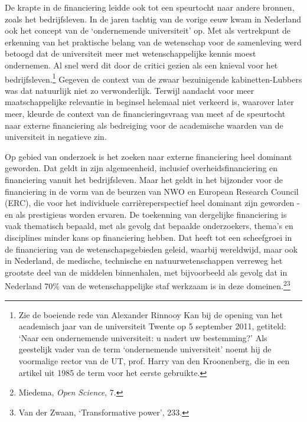 \documentclass[smallauthor, chapterhaspagenum, nochapterinheader, pagenuminheader,  bigchapnum,medium2, tocpages, garamond, titleinheader]{jote-book}
\begin{document}
	De krapte in de financiering leidde ook tot een speurtocht naar andere bronnen, zoals het bedrijfsleven. In de jaren tachtig van de vorige eeuw kwam in Nederland ook het concept van de ‘ondernemende universiteit' op. Met als vertrekpunt de erkenning van het praktische belang van de wetenschap voor de samenleving werd betoogd dat de universiteit meer met wetenschappelijke kennis moest ondernemen. Al snel werd dit door de critici gezien als een knieval voor het bedrijfsleven.\footnote{Zie de boeiende rede van Alexander Rinnooy Kan bij de opening van het academisch jaar van de universiteit Twente op 5 september 2011, getiteld: ‘Naar een ondernemende universiteit: u nadert uw bestemming?' Als geestelijk vader van de term ‘ondernemende universiteit' noemt hij de voormalige rector van de UT, prof. Harry van den Kroonenberg, die in een artikel uit 1985 de term voor het eerste gebruikte.} Gegeven de context van de zwaar bezuinigende kabinetten-Lubbers was dat natuurlijk niet zo verwonderlijk. Terwijl aandacht voor meer maatschappelijke relevantie in beginsel helemaal niet verkeerd is, waarover later meer, kleurde de context van de financieringsvraag van meet af de speurtocht naar externe financiering als bedreiging voor de academische waarden van de universiteit in negatieve zin.



	Op gebied van onderzoek is het zoeken naar externe financiering heel dominant geworden. Dat geldt in zijn algemeenheid, inclusief overheidsfinanciering en financiering vanuit het bedrijfsleven. Maar het geldt in het bijzonder voor de financiering in de vorm van de beurzen van NWO en European Research Council (ERC), die voor het individuele carrièreperspectief heel dominant zijn geworden - en als prestigieus worden ervaren. De toekenning van dergelijke financiering is vaak thematisch bepaald, met als gevolg dat bepaalde onderzoekers, thema's en disciplines minder kans op financiering hebben. Dat heeft tot een scheefgroei in de financiering van de wetenschapsgebieden geleid, waarbij wereldwijd, maar ook in Nederland, de medische, technische en natuurwetenschappen verreweg het grootste deel van de middelen binnenhalen, met bijvoorbeeld als gevolg dat in Nederland 70\% van de wetenschappelijke staf werkzaam is in deze domeinen.\footnote{Miedema, \emph{Open }\emph{Science}, 7.}\footnote{Van der Zwaan, ‘Transformative power', 233.}
\end{document}
